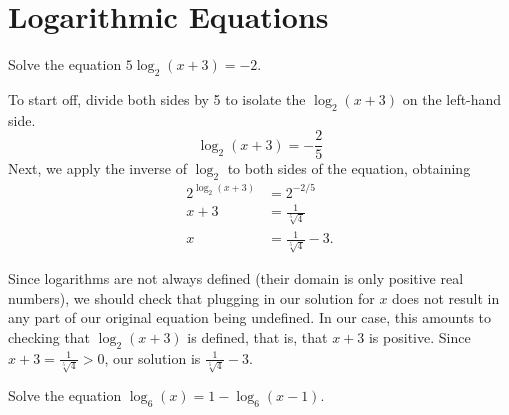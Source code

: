 \documentclass[nooutcomes]{ximera}
\begin{document}
\section{Logarithmic Equations}
\begin{example}
Solve the equation $5\log_2(x + 3) = -2$. 
\end{example}
\begin{explanation}
To start off, divide both sides by 5 to isolate the $\log_2(x + 3)$ on the left-hand side.
$$
\log_2(x + 3) = -\frac{2}{5}
$$
Next, we apply the inverse of $\log_2$ to both sides of the equation, obtaining
\begin{align*}
2^{\log_2(x + 3)} & = 2^{-2/5} \\
x + 3 & = \frac{1}{\sqrt[5]{4}} \\
x & = \frac{1}{\sqrt[5]{4}} - 3.
\end{align*}

Since logarithms are not always defined (their domain is only positive real numbers), we should check that plugging in our solution for $x$ does not result in any part of our original equation being undefined. In our case, this amounts to checking that $\log_2(x + 3)$ is defined, that is, that $x + 3$ is positive. Since $x + 3 = \frac{1}{\sqrt[5]{4}} > 0$, our solution is $\frac{1}{\sqrt[5]{4}} - 3$.
\end{explanation}

\begin{example}
Solve the equation $\log_6(x) = 1 - \log_6(x - 1)$.
\end{example}
\end{document}

